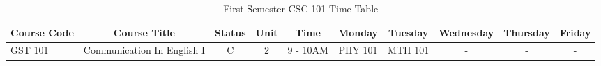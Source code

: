 \documentclass{article}
\begin{document}
		\begin{sidewaystable}[h!]
			\begin{center}
				\caption{First Semester CSC 101 Time-Table}
				\label{tab:table1}
				\begin{tabular}{l|c|c|c|c|c|c|c|c|c}
					\textbf{Course Code} & \textbf{Course Title} & \textbf{Status} & \textbf{Unit} & \textbf{Time} & \textbf{Monday} & \textbf{Tuesday} & \textbf{Wednesday} & \textbf{Thursday} & \textbf{Friday}\\
					\hline
					GST 101 & Communication In English I & C & 2 & 9 - 10AM & PHY 101 & MTH 101 & - & - & - \\
				\end{tabular}
			\end{center}
		\end{sidewaystable}
	
\end{document}
